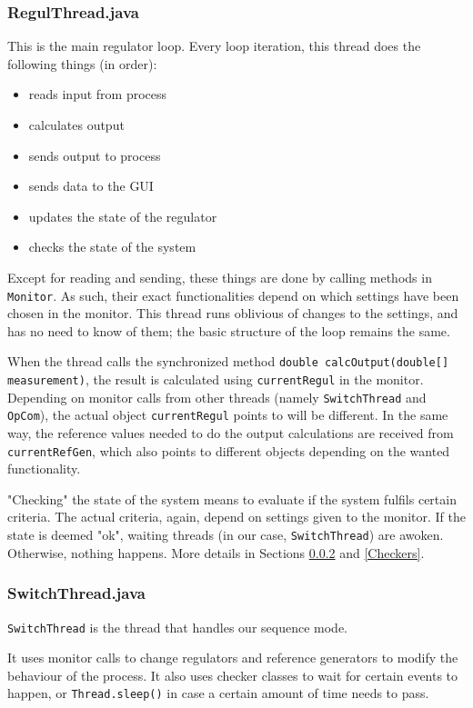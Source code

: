 \subsubsection{RegulThread.java}
This is the main regulator loop. Every loop iteration, this thread does the following things (in order):
\begin{itemize}
\item reads input from process
\item calculates output
\item sends output to process
\item sends data to the GUI
\item updates the state of the regulator
\item checks the state of the system
\end{itemize}

Except for reading and sending, these things are done by calling methods in \texttt{Monitor}. 
As such, their exact functionalities depend on which settings have been chosen in the monitor. 
This thread runs oblivious of changes to the settings, and has no need to know of them; the basic structure of the loop remains the same.

When the thread calls the synchronized method \texttt{double calcOutput(double[] measurement)}, the result is calculated using \texttt{currentRegul} in the monitor. 
Depending on monitor calls from other threads (namely \texttt{SwitchThread} and \texttt{OpCom}), the actual object \texttt{currentRegul} points to will be different. 
In the same way, the reference values needed to do the output calculations are received from \texttt{currentRefGen}, which also points to different objects depending on the wanted functionality.

"Checking" the state of the system means to evaluate if the system fulfils certain criteria. 
The actual criteria, again, depend on settings given to the monitor. 
If the state is deemed "ok", waiting threads (in our case, \texttt{SwitchThread}) are awoken. 
Otherwise, nothing happens. More details in Sections \ref{SwitchThread} and \ref{Checkers}.



\subsubsection{SwitchThread.java}\label{SwitchThread}
\texttt{SwitchThread} is the thread that handles our sequence mode.

It uses monitor calls to change regulators and reference generators to modify the behaviour of the process. 
It also uses checker classes to wait for certain events to happen, or \texttt{Thread.sleep()} in case a certain amount of time needs to pass.

